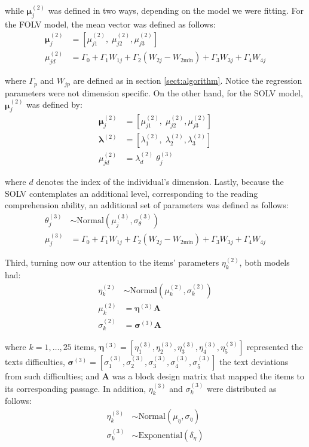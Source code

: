 while $\boldsymbol{\mu}^{(2)}_{j}$ was defined in two ways, depending on the model we were fitting. For the FOLV model, the mean vector was defined as follows:
%
\begin{align}
	\boldsymbol{\mu}^{(2)}_{j} &= \left[ \mu^{(2)}_{j1}, \; \mu^{(2)}_{j2}, \mu^{(2)}_{j3} \right] \\
	\mu^{(2)}_{jd} &= \Gamma_{0} + \Gamma_{1} W_{1j} + \Gamma_{2} (W_{2j} - W_{2\text{min}}) + \Gamma_{3} W_{3j} + \Gamma_{4} W_{4j}
\end{align}

where $\Gamma_{p}$ and $W_{jp}$ are defined as in section \ref{sect:algorithm}. Notice the regression parameters were not dimension specific. On the other hand, for the SOLV model, $\boldsymbol{\mu}^{(2)}_{j}$ was defined by:
%
\begin{align}
	\boldsymbol{\mu}^{(2)}_{j} &= \left[ \mu^{(2)}_{j1}, \; \mu^{(2)}_{j2}, \mu^{(2)}_{j3} \right] \\
	\pmb{\lambda}^{(2)} &= \left[ \lambda^{(2)}_{1}, \; \lambda^{(2)}_{2}, \lambda^{(2)}_{3} \right] \\
	\mu^{(2)}_{jd} &= \lambda^{(2)}_{d} \; \theta^{(3)}_{j} 
\end{align}

where $d$ denotes the index of the individual's dimension. Lastly, because the SOLV contemplates an additional level, corresponding to the reading comprehension ability, an additional set of parameters was defined as follows:
%
\begin{align}
	\theta^{(3)}_{j} &\sim \text{Normal} \left( \mu^{(3)}_{j}, \sigma^{(3)}_{\theta} \right) \\
	\mu^{(3)}_{j} &=  \Gamma_{0} + \Gamma_{1} W_{1j} + \Gamma_{2} (W_{2j} - W_{2\text{min}}) + \Gamma_{3} W_{3j} + \Gamma_{4} W_{4j}
\end{align}

Third, turning now our attention to the items' parameters $\eta^{(2)}_{k}$, both models had:
%
\begin{align}
	\eta^{(2)}_{k} &\sim \text{Normal} \left( \mu^{(2)}_{k}, \sigma^{(2)}_{k} \right) \\
	\mu^{(2)}_{k} &= \pmb{\eta}^{(3)} \mathbf{A} \\
	\sigma^{(2)}_{k} &= \pmb{\sigma}^{(3)} \mathbf{A}
\end{align}

where $k=1, \dots, 25$ items, $\pmb{\eta}^{(3)} = [ \eta^{(3)}_{1}, \eta^{(3)}_{2}, \eta^{(3)}_{3}, \eta^{(3)}_{4}, \eta^{(3)}_{5} ]$ represented the texts difficulties, $\pmb{\sigma}^{(3)} = [ \sigma^{(3)}_{1}, \sigma^{(3)}_{2}, \sigma^{(3)}_{3}, \sigma^{(3)}_{4}, \sigma^{(3)}_{5} ]$ the text deviations from such difficulties; and $\mathbf{A}$ was a block design matrix that mapped the items to its corresponding passage. In addition, $\eta^{(3)}_{k}$ and $\sigma^{(3)}_{k}$ were distributed as follows:
%
\begin{align}
	\eta^{(3)}_{k} &\sim \text{Normal} \left( \mu_{\eta}, \sigma_{\eta} \right) \\
	\sigma^{(3)}_{k} &\sim \text{Exponential} \left( \delta_{\eta} \right)
\end{align}

